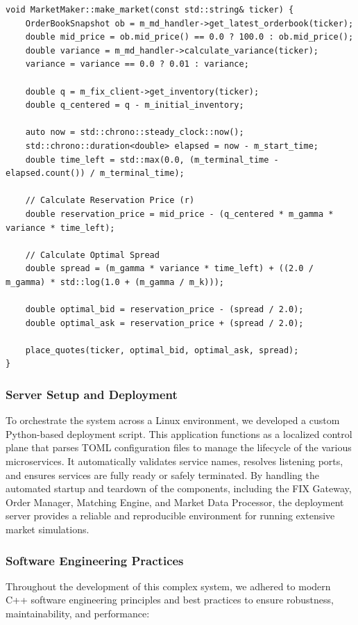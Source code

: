 \documentclass[12pt,a4paper]{article}
\begin{document}
\vspace{1em}
\begin{lstlisting}[caption={Avellaneda-Stoikov Market Maker Strategy}, label={lst:market_maker}]
void MarketMaker::make_market(const std::string& ticker) {
    OrderBookSnapshot ob = m_md_handler->get_latest_orderbook(ticker);
    double mid_price = ob.mid_price() == 0.0 ? 100.0 : ob.mid_price();
    double variance = m_md_handler->calculate_variance(ticker);
    variance = variance == 0.0 ? 0.01 : variance;

    double q = m_fix_client->get_inventory(ticker);
    double q_centered = q - m_initial_inventory;

    auto now = std::chrono::steady_clock::now();
    std::chrono::duration<double> elapsed = now - m_start_time;
    double time_left = std::max(0.0, (m_terminal_time - elapsed.count()) / m_terminal_time);

    // Calculate Reservation Price (r)
    double reservation_price = mid_price - (q_centered * m_gamma * variance * time_left);

    // Calculate Optimal Spread
    double spread = (m_gamma * variance * time_left) + ((2.0 / m_gamma) * std::log(1.0 + (m_gamma / m_k)));

    double optimal_bid = reservation_price - (spread / 2.0);
    double optimal_ask = reservation_price + (spread / 2.0);

    place_quotes(ticker, optimal_bid, optimal_ask, spread);
}
\end{lstlisting}

\subsubsection{Server Setup and Deployment}
To orchestrate the system across a Linux environment, we developed a custom Python-based deployment script. This application functions as a localized control plane that parses TOML configuration files to manage the lifecycle of the various microservices. It automatically validates service names, resolves listening ports, and ensures services are fully ready or safely terminated. By handling the automated startup and teardown of the components, including the FIX Gateway, Order Manager, Matching Engine, and Market Data Processor, the deployment server provides a reliable and reproducible environment for running extensive market simulations.

\subsubsection{Software Engineering Practices}
Throughout the development of this complex system, we adhered to modern C++ software engineering principles and best practices to ensure robustness, maintainability, and performance:
\end{document}

